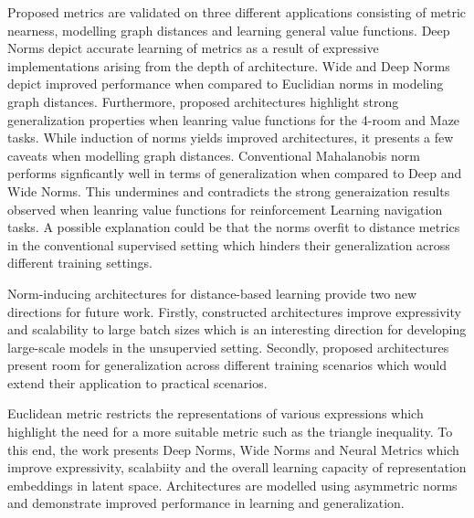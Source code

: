 \documentclass[11pt,letterpaper]{article}
\begin{document}
Proposed metrics are validated on three different applications consisting of metric nearness, modelling graph distances and learning general value functions. Deep Norms depict accurate learning of metrics as a result of expressive implementations arising from the depth of architecture. Wide and Deep Norms depict improved performance when compared to Euclidian norms in modeling graph distances. Furthermore, proposed architectures highlight strong generalization properties when leanring value functions for the 4-room and Maze tasks. While induction of norms yields improved architectures, it presents a few caveats when modelling graph distances. Conventional Mahalanobis norm performs signficantly well in terms of generalization when compared to Deep and Wide Norms. This undermines and contradicts the strong generaization results observed when leanring value functions for reinforcement Learning navigation tasks. A possible explanation could be that the norms overfit to distance metrics in the conventional supervised setting which hinders their generalization across different training settings. 

Norm-inducing architectures for distance-based learning provide two new directions for future work. Firstly, constructed architectures improve expressivity and scalability to large batch sizes which is an interesting direction for developing large-scale models in the unsupervied setting. Secondly, proposed architectures present room for generalization across different training scenarios which would extend their application to practical scenarios. 

Euclidean metric restricts the representations of various expressions which highlight the need for a more suitable metric such as the triangle inequality. To this end, the work presents Deep Norms, Wide Norms and Neural Metrics which improve expressivity, scalabiity and the overall learning capacity of representation embeddings in latent space. Architectures are modelled using asymmetric norms and demonstrate improved performance in learning and generalization. 
\end{document}

